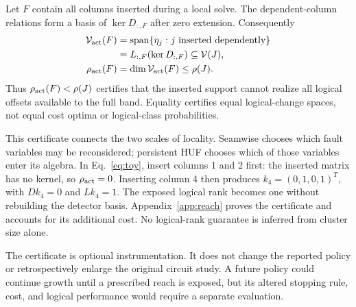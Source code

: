 \begin{proposition}\label{prop:exposed}
Let $F$ contain all columns inserted during a local solve. The dependent-column relations form a basis of $\ker D_{:,F}$ after zero extension. Consequently
\begin{equation}
\begin{split}
\mathcal V_{\rm act}(F)&=\operatorname{span}\{\eta_j:j\text{ inserted dependently}\}\\
&=L_{:,F}(\ker D_{:,F})\subseteq\mathcal V(J),\\
\rho_{\rm act}(F)&=\dim\mathcal V_{\rm act}(F)\le\rho(J).
\end{split}\label{eq:active}
\end{equation}
Thus $\rho_{\rm act}(F)<\rho(J)$ certifies that the inserted support cannot realize all logical offsets available to the full band. Equality certifies equal logical-change spaces, not equal cost optima or logical-class probabilities.
\end{proposition}
This certificate connects the two scales of locality. Seamwise chooses which fault variables may be reconsidered; persistent HUF chooses which of those variables enter its algebra. In Eq.~\eqref{eq:toy}, insert columns 1 and 2 first: the inserted matrix has no kernel, so $\rho_{\rm act}=0$. Inserting column 4 then produces $k_4=(0,1,0,1)^T$, with $Dk_4=0$ and $Lk_4=1$. The exposed logical rank becomes one without rebuilding the detector basis. Appendix~\ref{app:reach} proves the certificate and accounts for its additional cost. No logical-rank guarantee is inferred from cluster size alone.

The certificate is optional instrumentation. It does not change the reported policy or retrospectively enlarge the original circuit study. A future policy could continue growth until a prescribed reach is exposed, but its altered stopping rule, cost, and logical performance would require a separate evaluation.
